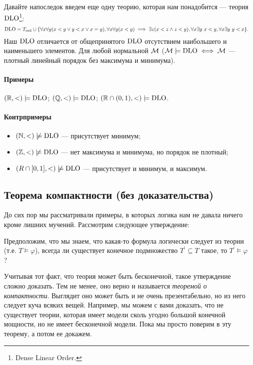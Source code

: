 Давайте напоследок введем еще одну теорию, которая нам понадобится --- теория $\operatorname{DLO}$\footnote{Dense Linear Order.}:
$$
    \operatorname{DLO} = T_{\text{ord}} \cup \{\forall x \forall y (x < y \lor y < x \lor x = y), \forall x \forall y (x < y) \implies \exists z (x < z \land z < y), \forall x \exists y~ x < y, \forall x \exists y~ y < x\}.
$$
Наш $\operatorname{DLO}$ отличается от общепринятого $\operatorname{DLO}$ отсутствием наибольшего и наименьшего элементов.
Для любой нормальной $\mathcal{M}$ ($\mathcal{M} \models \operatorname{DLO} \iff \mathcal{M}$ --- плотный линейный порядок без максимума и минимума).

\paragraph{Примеры}
$(\mathbb{R}, <) \models \operatorname{DLO}$; $(\mathbb{Q}, <) \models \operatorname{DLO}$; $(\mathbb{R} \cap (0, 1), <) \models \operatorname{DLO}$.

\paragraph{Контрпримеры}
\begin{itemize}
    \item $(\N, <) \centernot\models \DLO$ --- присутствует минимум;
    \item $(\Z, <) \centernot\models \DLO$ --- нет максимума и минимума, но порядок не плотный;
    \item $(R \cap [0, 1], <) \centernot\models \DLO$ --- присутствует и минимум, и максимум.
\end{itemize}

\subsection{Теорема компактности (без доказательства)}

До сих пор мы рассматривали примеры, в которых логика нам не давала ничего кроме лишних мучений.
Рассмотрим следующее утверждение:

\begin{statement*}
    Предположим, что мы знаем, что какая-то формула логически следует из теории (т.е. $T \models \varphi$), всегда ли существует конечное подмножество $T^{\prime} \subseteq T$ такое, то $T^{\prime} \models \varphi$?
\end{statement*}

Учитывая тот факт, что теория может быть бесконечной, такое утверждение сложно доказать.
Тем не менее, оно верно и называется {\it теоремой о компактности}.
Выглядит оно может быть и не очень презентабельно, но из него следует куча всяких вещей.
Например, мы можем с вами доказать, что не существует теории, которая имеет модели сколь угодно большой конечной мощности, но не имеет бесконечной модели.
Пока мы просто поверим в эту теорему, а потом ее докажем.

